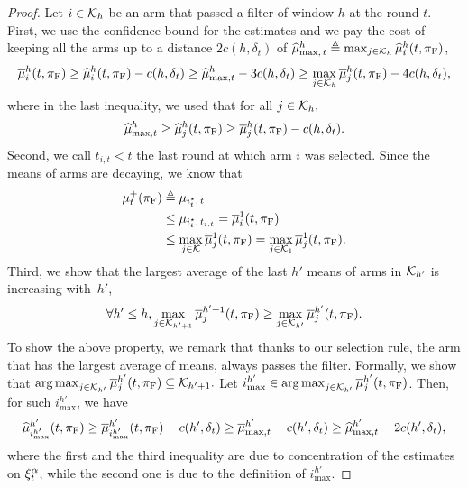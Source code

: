 \begin{proof}
Let $i \in \mathcal{K}_h$ be an arm that passed a filter of window $h$ at the round $t$.
First, we use the confidence bound for the estimates and we pay the cost of keeping all the arms up to a distance $2c(h,  \delta_t)$ of $\widehat{\mu}^{h}_{\max,\, t} \triangleq \max_{j \in \mathcal{K}_h} \widehat{\mu}_i^h(t,\pi_{\rm F})$,
\begin{equation}
\label{1}
\overline{\mu}_i^h(t,\pi_{\rm F})\geq \widehat{\mu}_i^h(t,\pi_{\rm F})- c(h,  \delta_t) \geq \widehat{\mu}^h_{\max,t} - 3c(h, \delta_t)
\geq \max_{j \in \mathcal{K}_h}\overline{\mu}_j^h(t,\pi_{\rm F})  - 4 c(h, \delta_t),
\end{equation}
where in the last inequality, we used that for all $j \in \mathcal{K}_h,$ \[\widehat{\mu}^{h}_{\max,t} \geq  \widehat{\mu}_j^h(t,\pi_{\rm F})  \geq \overline{\mu}_j^h(t,\pi_{\rm F})  - c(h, \delta_t).\]
Second, we call $t_{i,t} < t$ the last round at which arm $i$ was selected. Since the means of arms are decaying, we know that 
\begin{align}
\label{2}
 \mu^+_t(\pi_{\rm F}) &\triangleq \mu_{i^\star_t, \, t} \nonumber\\
 &\leq  \mu_{i^\star_t, \, t_{i,t}} =  \overline{\mu}_i^1(t,\pi_{\rm F})  \nonumber\\
 &\leq \max_{j \in \mathcal{K}}\overline{\mu}_j^1(t,\pi_{\rm F})  = \max_{j \in \mathcal{K}_1} \overline{\mu}_j^1(t,\pi_{\rm F}).
\end{align}
Third, we show that the largest average of the last $h'$ means of arms in $\mathcal{K}_{h'}$ is increasing with~$h'$,
\begin{equation*}
\forall  h' \leq h ,  \max_{j \in \mathcal{K}_{h'+1}}\overline{\mu}_j^{h'+1}(t,\pi_{\rm F})   \geq \max_{j \in \mathcal{K}_{h'}}\overline{\mu}_j^{h'}(t,\pi_{\rm F}). 
\end{equation*}
To show the above property, we remark that thanks to our selection rule, the arm that has the largest average of means, always passes the filter. Formally, we show that $\operatorname*{arg\,max}_{j \in \mathcal{K}_{h'}}\overline{\mu}_j^{h'}(t,\pi_{\rm F}) \subseteq \mathcal{K}_{h'+1}.$ 
Let $i^{h'}_{\max} \in \operatorname*{arg\,max}_{j \in \mathcal{K}_{h'}}\overline{\mu}_j^{h'}(t,\pi_{\rm F})$. Then, for such $i^{h'}_{\max}$, we have
\begin{equation*}
\widehat{\mu}_{i^{h'}_{\max}}^{h'}(t,\pi_{\rm F}) \geq \overline{\mu}_{i^{h'}_{\max}}^{h'}(t,\pi_{\rm F}) - c(h', \delta_t) 
\geq \overline{\mu}^{h'}_{\max,t} - c(h', \delta_t) \geq \widehat{\mu}^{h'}_{\max,t}- 2c(h', \delta_t),
\end{equation*}
where the first and the third inequality are due to concentration of the estimates on $\xi^\alpha_t$, while the second one is due to the definition of $i^{h'}_{\max}$. 


\end{proof}
